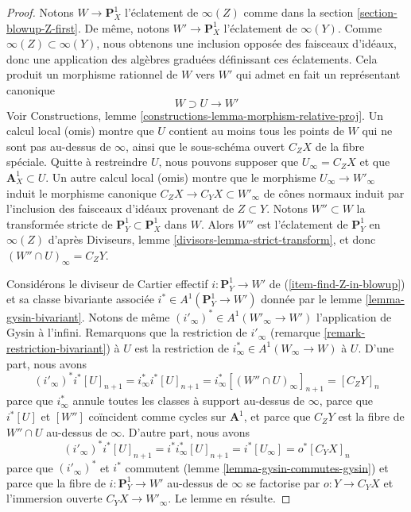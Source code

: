 \begin{proof}
Notons $W \to \mathbf{P}^1_X$ l'éclatement de $\infty(Z)$ comme dans la
section \ref{section-blowup-Z-first}.
De même, notons $W' \to \mathbf{P}^1_X$ l'éclatement de $\infty(Y)$.
Comme $\infty(Z) \subset \infty(Y)$, nous obtenons une inclusion opposée
des faisceaux d'idéaux, donc une application des algèbres graduées
définissant ces éclatements. Cela produit un morphisme rationnel de $W$
vers $W'$ qui admet en fait un représentant canonique
$$
W \supset U \longrightarrow W'
$$
Voir Constructions, lemme \ref{constructions-lemma-morphism-relative-proj}.
Un calcul local (omis) montre que $U$ contient au moins tous les points
de $W$ qui ne sont pas au-dessus de $\infty$, ainsi que le sous-schéma ouvert $C_Z X$ de la fibre
spéciale. Quitte à restreindre $U$, nous pouvons supposer que $U_\infty = C_Z X$ et que
$\mathbf{A}^1_X \subset U$. Un autre calcul local (omis)
montre que le morphisme $U_\infty \to W'_\infty$
induit le morphisme canonique $C_Z X \to C_Y X \subset W'_\infty$
de cônes normaux induit par l'inclusion des faisceaux d'idéaux
provenant de $Z \subset Y$. Notons $W'' \subset W$ la transformée stricte de
$\mathbf{P}^1_Y \subset \mathbf{P}^1_X$ dans $W$. Alors $W''$ est l'éclatement
de $\mathbf{P}^1_Y$ en $\infty(Z)$ d'après
Diviseurs, lemme \ref{divisors-lemma-strict-transform},
et donc $(W'' \cap U)_\infty = C_ZY$.

\medskip\noindent
Considérons le diviseur de Cartier effectif $i : \mathbf{P}^1_Y \to W'$
de (\ref{item-find-Z-in-blowup}) et sa classe bivariante associée
$i^* \in A^1(\mathbf{P}^1_Y \to W')$ donnée par le lemme \ref{lemma-gysin-bivariant}.
Notons de même $(i'_\infty)^* \in A^1(W'_\infty \to W')$
l'application de Gysin à l'infini. Remarquons que la restriction de $i'_\infty$
(remarque \ref{remark-restriction-bivariant}) à $U$ est la restriction de
$i_\infty^* \in A^1(W_\infty \to W)$ à $U$. D'une part, nous avons
$$
(i'_\infty)^* i^* [U]_{n + 1} =
i_\infty^* i^* [U]_{n + 1} =
i_\infty^* [(W'' \cap U)_\infty]_{n + 1} =
[C_ZY]_n
$$
parce que $i_\infty^*$ annule toutes les classes à support au-dessus de $\infty$, parce que
$i^*[U]$ et $[W'']$ coïncident comme cycles sur $\mathbf{A}^1$, et parce que
$C_ZY$ est la fibre de $W'' \cap U$ au-dessus de $\infty$.
D'autre part, nous avons
$$
(i'_\infty)^* i^* [U]_{n + 1} =
i^* i_\infty^*[U]_{n + 1} =
i^* [U_\infty] =
o^*[C_YX]_n
$$
parce que $(i'_\infty)^*$ et $i^*$ commutent
(lemme \ref{lemma-gysin-commutes-gysin})
et parce que la fibre de $i : \mathbf{P}^1_Y \to W'$ au-dessus de $\infty$
se factorise par $o : Y \to C_YX$ et l'immersion ouverte $C_YX \to W'_\infty$.
Le lemme en résulte.
\end{proof}

